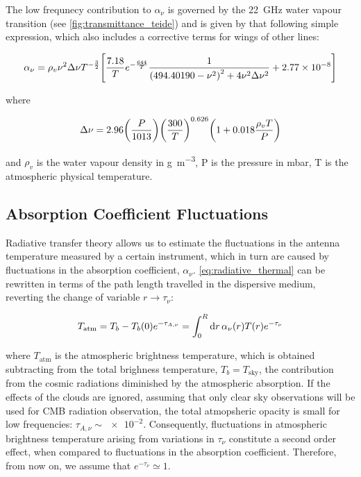 The low frequnecy contribution to $\alpha_\nu$ is governed by the
\SI{22}{\giga\hertz} water vapour transition (see
\autoref{fig:transmittance_teide}) and is given by that following simple
expression, which also includes a corrective terms for wings of other
lines:

\begin{equation}
        \alpha_\nu = \rho_v\nu^2\Delta \nu T^{-\frac{3}{2}}
        \qty[\frac{7.18}{T} e^{-\frac{644}{T}}
        \frac{1}{\qty(494.40190 - \nu^2)^2 + 4\nu^2\Delta \nu^2}
        + \num{2.77e-8}]
\end{equation}

where

\begin{equation}
        \Delta \nu = 2.96\qty(\frac{P}{1013})\qty(\frac{300}{T})^{0.626}
        \qty(1 + 0.018\frac{\rho_v T}{P})
\end{equation}

and $\rho_v$ is the water vapour density in \si{\gram\per\cubic\meter}, P
is the pressure in \si{\milli\bar}, T is the atmospheric physical
temperature.

\subsection{Absorption Coefficient Fluctuations}

Radiative transfer theory allows us to estimate the fluctuations
in the antenna temperature measured by a certain instrument, which in turn
are caused by fluctuations in the absorption coefficient, $\alpha_\nu$.
\autoref{eq:radiative_thermal} can be rewritten in terms of the path length
travelled in the dispersive medium, reverting the change of variable $r
\rightarrow \tau_\nu$:

\begin{equation}
        T_\text{atm} = T_b - T_b\qty(0) e^{-\tau_{A,\nu}} =
        \int^R_0 \dd{r} \alpha_\nu\qty(r) T\qty(r) e^{-\tau_\nu}
        \label{eq:radiative_atm}
\end{equation}

where $T_\text{atm}$ is the atmospheric brightness temperature, which is
obtained subtracting from the total brighness temperature, $T_b =
T_\text{sky}$, the contribution from the cosmic radiations diminished by
the atmospheric absorption. If the effects of the clouds are ignored,
assuming that only clear sky observations will be used for CMB radiation
observation, the total atmopsheric opacity is small for low frequencies:
$\tau_{A,\nu} \sim \num{e-2}$. Consequently, fluctuations in atmospheric
brightness temperature arising from variations in $\tau_\nu$ constitute a
second order effect, when compared to fluctuations in the absorption
coefficient. Therefore, from now on, we assume that $e^{-\tau_\nu} \simeq
1$.

